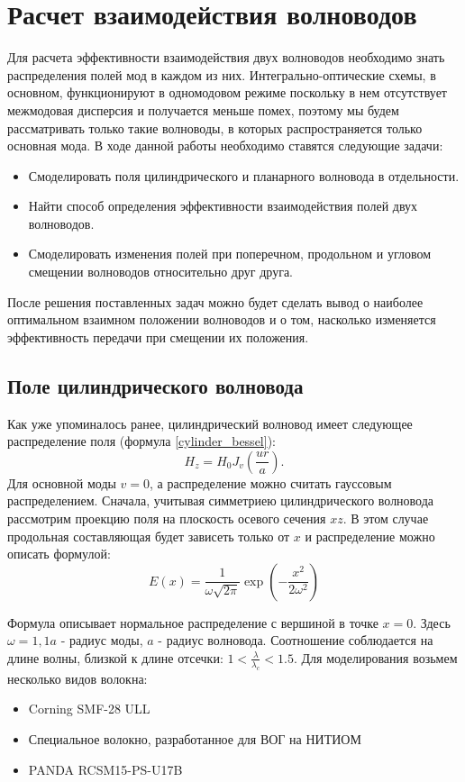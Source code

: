 \chapter{Расчет взаимодействия волноводов}
\label{coupling}

Для расчета эффективности взаимодействия двух волноводов необходимо знать распределения полей мод в каждом из них. Интегрально-оптические схемы, в основном, функционируют в одномодовом режиме поскольку в нем отсутствует межмодовая дисперсия и получается меньше помех, поэтому мы будем рассматривать только такие волноводы, в которых распространяется только основная мода. В ходе данной работы необходимо ставятся следующие задачи:
\begin{itemize}
	\item Смоделировать поля цилиндрического и планарного волновода в отдельности.
	\item Найти способ определения эффективности взаимодействия полей двух волноводов.
	\item Смоделировать изменения полей при поперечном, продольном и угловом смещении волноводов относительно друг друга.
\end{itemize} 
После решения поставленных задач можно будет сделать вывод о наиболее оптимальном взаимном положении волноводов и о том, насколько изменяется эффективность передачи при смещении их положения.

\section{Поле цилиндрического волновода}
\label{cylinder_field}
Как уже упоминалось ранее, цилиндрический волновод имеет следующее распределение поля (формула \ref{cylinder_bessel}):
$$
	H_z = H_0 J_v (\frac{ur}{a}).
$$
Для основной моды $v = 0$, а распределение можно считать гауссовым распределением. Сначала, учитывая  симметриею цилиндрического волновода рассмотрим проекцию поля на плоскость осевого сечения $xz$. В этом случае продольная составляющая будет зависеть только от $x$ и распределение можно описать формулой:
\begin{equation}
  \label{gauss}
  E(x)=\frac{1}{\omega\sqrt{2\pi}}\exp\left(-\frac{x^2}{2\omega^2}\right)
\end{equation}

Формула описывает нормальное распределение с вершиной в точке $x=0$.
Здесь $\omega = 1{,}1a$ - радиус моды, $a$ - радиус волновода. Соотношение соблюдается на длине волны, близкой к длине отсечки: $1 < \frac{\lambda}{\lambda_c} < 1.5$. Для моделирования возьмем несколько видов волокна:
\begin{itemize}
\item Corning SMF-28 ULL
\item Специальное волокно, разработанное для ВОГ на НИТИОМ
\item PANDA RCSM15-PS-U17B
\end{itemize}

